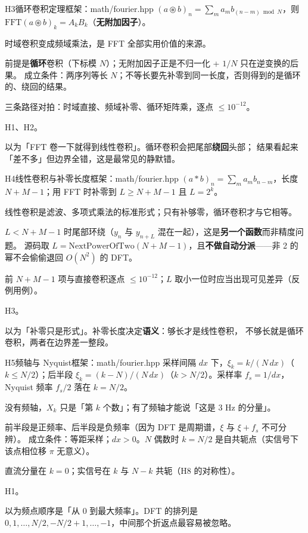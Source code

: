 \begin{know}{H3}{循环卷积定理}{框架：math/fourier.hpp}
 $(a\circledast b)_n=\sum_{m}a_m b_{(n-m)\bmod N}$，则
$\mathrm{FFT}(a\circledast b)_k=A_kB_k$（\textbf{无附加因子}）。

 时域卷积变成频域乘法，是 FFT 全部实用价值的来源。

 前提是\textbf{循环}卷积（下标模 $N$）；无附加因子正是不归一化 + $1/N$ 只在逆变换的后果。
成立条件：两序列等长 $N$；不等长要先补零到同一长度，否则得到的是循环的、绕回的结果。

 三条路径对拍：时域直接、频域补零、循环矩阵乘，逐点 $\le10^{-12}$。

 H1、H2。

 以为「FFT 卷一下就得到线性卷积」。循环卷积会把尾部\textbf{绕回}头部；
结果看起来「差不多」但边界全错，这是最常见的静默错。
\end{know}

\begin{know}{H4}{线性卷积与补零长度}{框架：math/fourier.hpp}
 $(a*b)_n=\sum_m a_mb_{n-m}$，长度 $N+M-1$；用 FFT 时补零到
$L\ge N+M-1$ 且 $L=2^{k}$。

 线性卷积是滤波、多项式乘法的标准形式；只有补够零，循环卷积才与它相等。

 $L<N+M-1$ 时尾部环绕（$y_{n}$ 与 $y_{n+L}$ 混在一起），这是\textbf{另一个函数}而非精度问题。
源码取 $L=\text{NextPowerOfTwo}(N+M-1)$，且\textbf{不做自动分派}——非 2 的幂不会偷偷退回 $O(N^{2})$ 的 DFT。

 前 $N+M-1$ 项与直接卷积逐点 $\le10^{-12}$；$L$ 取小一位时应当出现可见差异（反例用例）。

 H3。

 以为「补零只是形式」。补零长度决定\textbf{语义}：够长才是线性卷积，
不够长就是循环卷积，两者在边界差一整段。
\end{know}

\begin{know}{H5}{频轴与 Nyquist}{框架：math/fourier.hpp}
 采样间隔 $dx$ 下，$\xi_k=k/(N\,dx)$（$k\le N/2$）；后半段
$\xi_k=(k-N)/(N\,dx)$（$k>N/2$）。采样率 $f_s=1/dx$，Nyquist 频率 $f_s/2$ 落在 $k=N/2$。

 没有频轴，$X_k$ 只是「第 $k$ 个数」；有了频轴才能说「这是 3 Hz 的分量」。

 前半段是正频率、后半段是负频率（因为 DFT 是周期谱，$\xi$ 与 $\xi+f_s$ 不可分辨）。
成立条件：等距采样；$dx>0$。$N$ 偶数时 $k=N/2$ 是自共轭点（实信号下该点相位移 $\pi$ 无意义）。

 直流分量在 $k=0$；实信号在 $k$ 与 $N-k$ 共轭（H8 的对称性）。

 H1。

 以为频点顺序是「从 0 到最大频率」。DFT 的排列是
$0,1,\dots,N/2,-N/2+1,\dots,-1$，中间那个折返点最容易被忽略。
\end{know}

